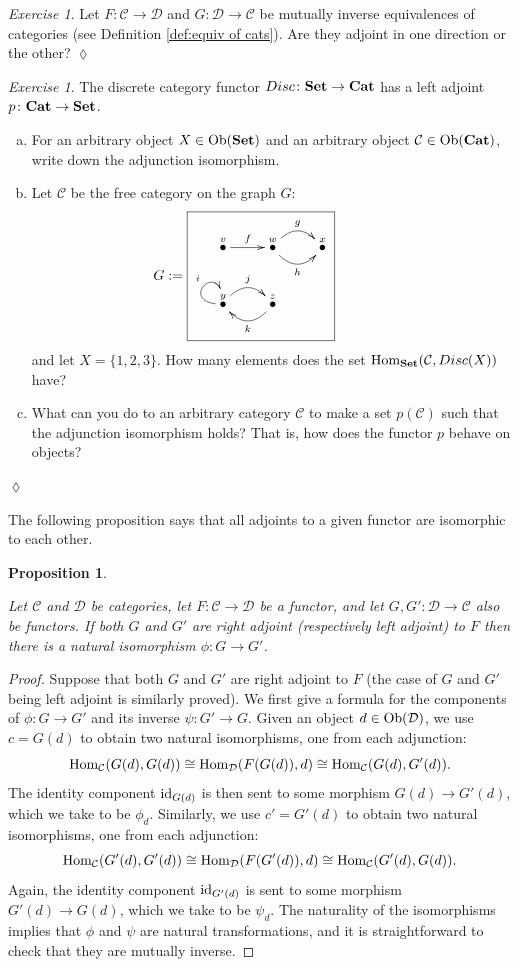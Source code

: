 \documentclass{book}
\def\tn{\textnormal}
\def\mc{\mathcal}
\def\Hom{\tn{Hom}}
\def\Ob{\tn{Ob}}
\def\to{\rightarrow}
\def\taking{\colon}
\def\iso{\cong}
\newcommand{\LMO}[1]{\stackrel{#1}{\bullet}}
\def\id{\tn{id}}
\def\Cat{{\bf Cat}}
\def\Set{{\bf Set}}
\def\mcC{\mc{C}}
\def\mcD{\mc{D}}
\newtheorem{proposition}[subsubsection]{Proposition}
\theoremstyle{remark}
\newtheorem{exc}[subsubsection]{Exercise}
\newenvironment{exercise}{\begin{exc}}{\hspace*{\fill}$\lozenge$\end{exc}}
\theoremstyle{definition}
\def\sexc{\begin{enumerate}[a.)]\setlength{\itemsep}{.1cm}\setlength{\parskip}{.1cm}\item}
\def\next{\item}
\def\endsexc{\end{enumerate}}
\begin{document}
\begin{exercise}
Let $F\taking\mcC\to\mcD$ and $G\taking\mcD\to\mcC$ be mutually inverse equivalences of categories (see Definition \ref{def:equiv of cats}). Are they adjoint in one direction or the other?
\end{exercise}

\begin{exercise}
The discrete category functor $Disc\taking\Set\to\Cat$ has a left adjoint $p\taking\Cat\to\Set$. 
\sexc For an arbitrary object $X\in\Ob(\Set)$ and an arbitrary object $\mcC\in\Ob(\Cat)$, write down the adjunction isomorphism.
\next Let $\mcC$ be the free category on the graph $G$:
$$
G:=\parbox{2in}{\fbox{\xymatrix{\LMO{v}\ar[r]^f&\LMO{w}\ar@/_1pc/[r]_h\ar@/^1pc/[r]^g&\LMO{x}\\\LMO{y}\ar@(l,u)[]^i\ar@/^1pc/[r]^j&\LMO{z}\ar@/^1pc/[l]^k}}}
$$
and let $X=\{1,2,3\}$. How many elements does the set $\Hom_\Set(\mcC,Disc(X))$ have?
\next What can you do to an arbitrary category $\mcC$ to make a set $p(\mcC)$ such that the adjunction isomorphism holds? That is, how does the functor $p$ behave on objects?
\endsexc
\end{exercise}

The following proposition says that all adjoints to a given functor are isomorphic to each other. 

\begin{proposition}\label{prop:unicity of adjoints}

Let $\mcC$ and $\mcD$ be categories, let $F\taking\mcC\to\mcD$ be a functor, and let $G,G'\taking\mcD\to\mcC$ also be functors. If both $G$ and $G'$ are right adjoint (respectively left adjoint) to $F$ then there is a natural isomorphism $\phi\taking G\to G'$.

\end{proposition}

\begin{proof}

Suppose that both $G$ and $G'$ are right adjoint to $F$ (the case of $G$ and $G'$ being left adjoint is similarly proved). We first give a formula for the components of $\phi\taking G\to G'$ and its inverse $\psi\taking G'\to G$. Given an object $d\in\Ob(\mcD)$, we use $c=G(d)$ to obtain two natural isomorphisms, one from each adjunction: 
$$\Hom_\mcC(G(d),G(d))\iso\Hom_\mcD(F(G(d)),d)\iso\Hom_\mcC(G(d),G'(d)).$$
The identity component $\id_{G(d)}$ is then sent to some morphism $G(d)\to G'(d)$, which we take to be $\phi_d$. Similarly, we use $c'=G'(d)$ to obtain two natural isomorphisms, one from each adjunction:
$$\Hom_\mcC(G'(d),G'(d))\iso\Hom_\mcD(F(G'(d)),d)\iso\Hom_\mcC(G'(d),G(d)).$$
Again, the identity component $\id_{G'(d)}$ is sent to some morphism $G'(d)\to G(d)$, which we take to be $\psi_d$. The naturality of the isomorphisms implies that $\phi$ and $\psi$ are natural transformations, and it is straightforward to check that they are mutually inverse.

\end{proof}
\end{document}
